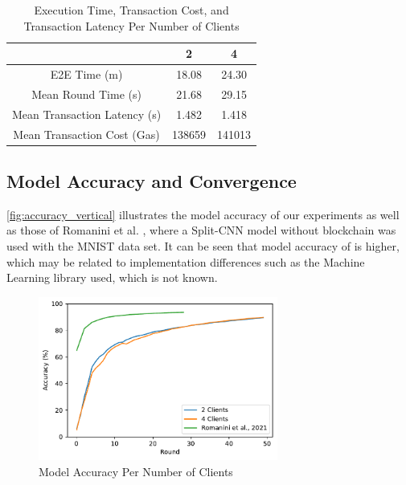 \begin{table}[!ht]
\begin{tabular}{c|c|c} \hline \hline
                                & 2             & 4             \\ \hline \hline
E2E Time (m)                    & 18.08         &	24.30       \\ \hline
Mean Round Time (s)             & 21.68         &	29.15       \\ \hline
Mean Transaction Latency (s)    & 1.482         &	1.418       \\ \hline
Mean Transaction Cost (Gas)     & 138659        &	141013      \\ \hline
\end{tabular}
\caption{Execution Time, Transaction Cost, and Transaction Latency Per Number of Clients}
\label{tab:metrics_vertical}
\end{table}

\subsection{Model Accuracy and Convergence}

\autoref{fig:accuracy_vertical} illustrates the model accuracy of our experiments as well as those of Romanini et al. \cite{10.48550/arxiv.2104.00489}, where a Split-CNN model without blockchain was used with the MNIST data set. It can be seen that model accuracy of \cite{10.48550/arxiv.2104.00489} is higher, which may be related to implementation differences such as the Machine Learning library used, which is not known.

\begin{figure}[!ht]
    \centering
    \centering
    \includegraphics[width=0.7\textwidth]{graphics/vertical/accuracy.pdf}
    \caption{Model Accuracy Per Number of Clients}
    \label{fig:accuracy_vertical}
\end{figure}

